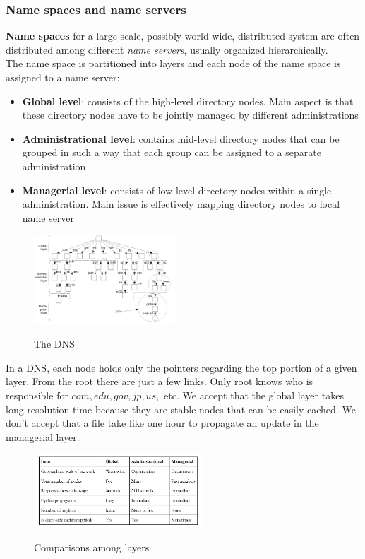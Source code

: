 \documentclass[10pt,a4paper]{article}
\begin{document}
\subsubsection{Name spaces and name servers}
\textbf{Name spaces} for a large scale, possibly world wide, distributed system are often distributed among different \textit{name servers}, usually organized hierarchically. \\ 
The name space is partitioned into layers and each node of the name space is assigned to a name server:
\begin{itemize}
	\item \textbf{Global level}: consists of the high-level directory nodes. Main aspect is that these directory nodes have to be jointly managed by different administrations
	\item \textbf{Administrational level}: contains mid-level directory nodes that can be grouped in such a way that each group can be assigned to a separate administration
	\item \textbf{Managerial level}: consists of low-level directory nodes within a single administration. Main issue is effectively mapping directory nodes to local name server
\end{itemize} 
\begin{figure}[h!]
 \hfill \includegraphics[width=150pt]{images/dns.png}\hspace*{\fill}
  \label{fig:dns}
  \caption{The DNS}
\end{figure}
In a DNS, each node holds only the pointers regarding the top portion of a given layer. From the root there are just a few links. Only root knows who is responsible for $com, edu, gov, jp, us,$ etc. We accept that the global layer takes long resolution time because they are stable nodes that can be easily cached. We don't accept that a file take like one hour to propagate an update in the managerial layer.
\begin{figure}[h!]
 \hfill \includegraphics[width=180pt]{images/comparisons-layers.png}\hspace*{\fill}
  \label{fig:comp-layers}
  \caption{Comparisons among layers}
\end{figure}
\end{document}
